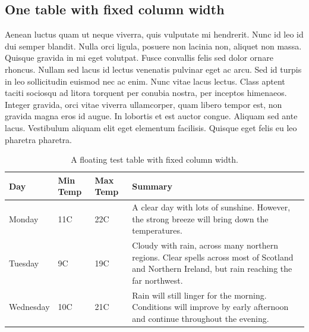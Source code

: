 \subsection{One table with fixed column width}
Aenean luctus quam ut neque viverra, quis vulputate mi hendrerit. Nunc id leo
id dui semper blandit. Nulla orci ligula, posuere non lacinia non, aliquet non
massa. Quisque gravida in mi eget volutpat. Fusce convallis felis sed dolor
ornare rhoncus. Nullam sed lacus id lectus venenatis pulvinar eget ac arcu. Sed
id turpis in leo sollicitudin euismod nec ac enim. Nunc vitae lacus lectus.
Class aptent taciti sociosqu ad litora torquent per conubia nostra, per
inceptos himenaeos. Integer gravida, orci vitae viverra ullamcorper, quam
libero tempor est, non gravida magna eros id augue. In lobortis et est auctor
congue. Aliquam sed ante lacus. Vestibulum aliquam elit eget elementum
facilisis. Quisque eget felis eu leo pharetra pharetra.

\begin{table}[!ht]
  \centering
    \begin{tabular}{ | l | l | l | p{5cm} |}
    \hline
    Day & Min Temp & Max Temp & Summary \\ \hline
    Monday & 11C & 22C & A clear day with lots of sunshine.
    However, the strong breeze will bring down the temperatures. \\ \hline
    Tuesday & 9C & 19C & Cloudy with rain, across many northern regions. Clear spells
    across most of Scotland and Northern Ireland,
    but rain reaching the far northwest. \\ \hline
    Wednesday & 10C & 21C & Rain will still linger for the morning.
    Conditions will improve by early afternoon and continue
    throughout the evening. \\
    \hline
    \end{tabular}
  \caption{A floating test table with fixed column width.}
  \label{tab:testtab6}
\end{table}

